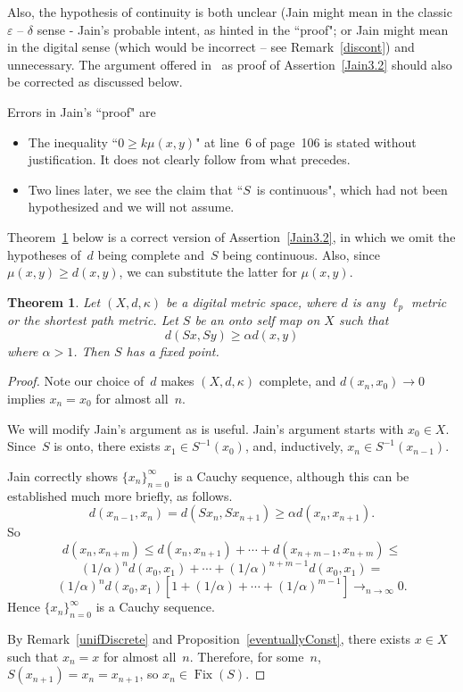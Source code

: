 \documentclass{article}
\newtheorem{thm}{Theorem}
\numberwithin{thm}{section}
\DeclareMathOperator{\Fix}{Fix}
\begin{document}
Also, the hypothesis of
continuity is both
unclear (Jain might
mean in the classic
$\varepsilon$ -- $\delta$ sense - Jain's probable intent, as hinted in the ``proof"; or
Jain might mean in 
the digital sense (which would be incorrect -- see
Remark~\ref{discont}) and unnecessary.
The argument offered 
in~\cite{Jain18} as proof of
Assertion~\ref{Jain3.2} should also be
corrected as discussed below.

Errors in Jain's 
``proof" are \begin{itemize}
    \item The inequality 
    ``$0 \ge k \mu(x,y)$" at line~6 of page~106 is stated without justification.
    It does not clearly follow from what precedes.
    \item Two lines later, we see the claim that
    ``$S$~is continuous", which had not been 
    hypothesized and we will not assume.
\end{itemize}

Theorem~\ref{correctedJain3.2}
below is a correct 
version of Assertion~\ref{Jain3.2}, in which we
omit the hypotheses
of~$d$ being complete and~$S$
being continuous.
Also, since
$\mu(x,y) \ge d(x,y)$, we
can substitute the latter 
for $\mu(x,y)$.

\begin{thm}
\label{correctedJain3.2}
        Let $(X,d,\kappa)$
    be a digital metric space, where
    $d$ is any
    $\ell_p$ metric
    or the shortest
    path metric.
    Let $S$ be an
    onto self map 
    on $X$ such that
    \[ d(Sx,Sy) \ge
    \alpha d(x,y)
    \]
    where $\alpha > 1$.
    Then $S$ has a
    fixed point.
\end{thm}

\begin{proof}
Note our choice 
of~$d$ makes
$(X,d,\kappa)$
complete, and
$d(x_n,x_0) \to 0$
implies $x_n=x_0$
for almost all~$n$.

We will modify Jain's argument
as is useful.
Jain's argument
starts with 
$x_0 \in X$. 
Since~$S$ is onto,
there exists 
$x_1 \in S^{-1}(x_0)$, and,
inductively, $x_n \in S^{-1}(x_{n-1})$. 

Jain correctly shows
$\{x_n\}_{n=0}^{\infty}$ is a Cauchy
sequence, although
this can be established 
much more briefly,
as follows.
\[ d(x_{n-1},x_n) =
d(Sx_n, Sx_{n+1})
\ge \alpha  
d(x_n,x_{n+1}).
\]
So
\[ d(x_n,x_{n+m}) \le
d(x_n,x_{n+1}) + 
\cdots + 
d(x_{n+m-1},x_{n+m}) \le
\]
\[
(1/\alpha)^n d(x_0,x_1) + \cdots
+ (1/\alpha)^{n+m-1}d(x_0,x_1) =
\]
\[ (1/\alpha)^n d(x_0,x_1) 
\left [
1 + (1/\alpha) + \cdots
+ (1/\alpha)^{m-1}
\right ]
\to_{n \to \infty} 0.
\]
Hence $\{x_n\}_{n=0}^{\infty}$ is a Cauchy
sequence.

By Remark~\ref{unifDiscrete} and 
Proposition~\ref{eventuallyConst}, there
exists $x \in X$
such that $x_n = x$
for almost all~$n$.
Therefore, for 
some~$n$,
$S(x_{n+1}) = x_n = x_{n+1}$, so
$x_n \in \Fix(S)$.
\end{proof}
\end{document}
